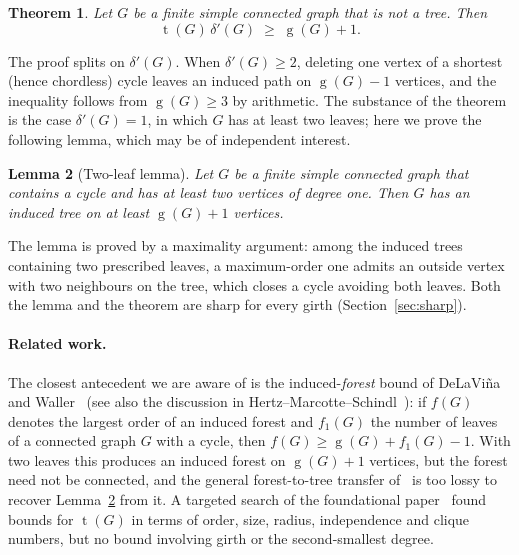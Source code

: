 \documentclass[11pt]{article}
\numberwithin{equation}{section}
\newtheorem{theorem}{Theorem}[section]
\newtheorem{lemma}[theorem]{Lemma}
\theoremstyle{remark}
\newcommand{\tr}{\operatorname{t}}
\newcommand{\gr}{\operatorname{g}}
\newcommand{\dd}{\delta'}
\begin{document}
\begin{theorem}\label{thm:main}
Let $G$ be a finite simple connected graph that is not a tree.  Then
\[
  \tr(G)\,\dd(G)\;\ge\;\gr(G)+1 .
\]
\end{theorem}

The proof splits on $\dd(G)$.  When $\dd(G)\ge2$, deleting one vertex of a
shortest (hence chordless) cycle leaves an induced path on $\gr(G)-1$ vertices,
and the inequality follows from $\gr(G)\ge3$ by arithmetic.  The substance of
the theorem is the case $\dd(G)=1$, in which $G$ has at least two leaves; here
we prove the following lemma, which may be of independent interest.

\begin{lemma}[Two-leaf lemma]\label{lem:twoleaf-intro}
Let $G$ be a finite simple connected graph that contains a cycle and has at
least two vertices of degree one.  Then $G$ has an induced tree on at least
$\gr(G)+1$ vertices.
\end{lemma}

The lemma is proved by a maximality argument: among the induced trees
containing two prescribed leaves, a maximum-order one admits an outside vertex
with two neighbours on the tree, which closes a cycle avoiding both leaves.
Both the lemma and the theorem are sharp for every girth
(Section~\ref{sec:sharp}).

\paragraph{Related work.}
The closest antecedent we are aware of is the induced-\emph{forest} bound of
DeLaVi\~na and Waller~\cite{DW04} (see also the discussion in
Hertz--Marcotte--Schindl~\cite{HMS14}): if $f(G)$ denotes the largest order of
an induced forest and $f_1(G)$ the number of leaves of a connected graph $G$
with a cycle, then $f(G)\ge\gr(G)+f_1(G)-1$.  With two leaves this produces an
induced forest on $\gr(G)+1$ vertices, but the forest need not be connected,
and the general forest-to-tree transfer of~\cite[Theorem~2.3]{HMS14} is too
lossy to recover Lemma~\ref{lem:twoleaf-intro} from it.  A targeted search of
the foundational paper~\cite{ESS86} found bounds for $\tr(G)$ in terms of
order, size, radius, independence and clique numbers, but no bound involving
girth or the second-smallest degree.
\end{document}

